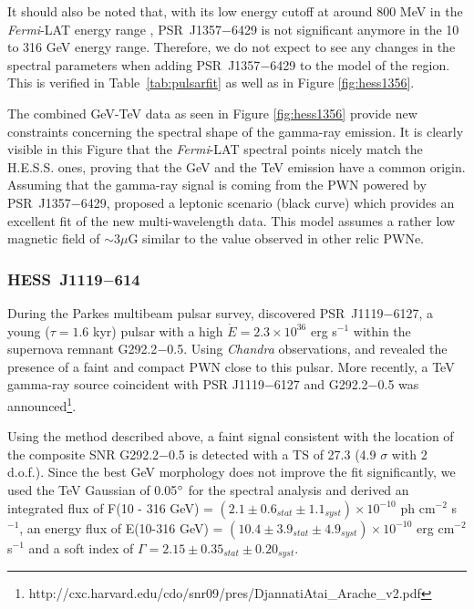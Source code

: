 It should also be noted that, with its low energy cutoff at around 800 MeV in the \emph{Fermi}-LAT energy range \citep{2011AA...533A.102L}, PSR~J1357$-$6429 is not significant anymore in the 10 to 316 GeV energy range. Therefore, we do not expect to see any changes in the spectral parameters when adding PSR~J1357$-$6429 to the model of the region. This is verified in Table~\ref{tab:pulsarfit} as well as in Figure \ref{fig:hess1356}. 

The combined GeV-TeV data as seen in Figure \ref{fig:hess1356} provide new constraints concerning the spectral shape of the gamma-ray emission. It is clearly visible in this Figure that the \emph{Fermi}-LAT spectral points nicely match the H.E.S.S. ones, proving that the GeV and the TeV emission have a common origin. Assuming that the gamma-ray signal is coming from the PWN powered by PSR~J1357$-$6429, \cite{2011AA...533A.103H} proposed a leptonic scenario (black curve) which provides an excellent fit of the new multi-wavelength data. This model assumes a rather low magnetic field of $\sim 3 \mu$G similar to the value observed in other relic PWNe. 

\subsubsection*{HESS~J1119$-$614}

During the Parkes multibeam pulsar survey, \cite{2000ApJ...541..367C} discovered PSR~J1119$-$6127, a young ($\tau = 1.6$ kyr) pulsar with a high $\dot{E} = 2.3 \times 10^{36}$ erg s$^{-1}$ within the supernova remnant G292.2$-$0.5. Using \emph{Chandra} observations, \cite{2003ApJ...591L.143G} and \cite{2008ApJ...684..532S} revealed the presence of a faint and compact PWN close to this pulsar. More recently, a TeV gamma-ray source coincident with PSR J1119$-$6127 and G292.2$-$0.5 was announced\footnote{http://cxc.harvard.edu/cdo/snr09/pres/DjannatiAtai\_Arache\_v2.pdf}.

Using the method described above, a faint signal consistent with the location of the composite SNR G292.2$-$0.5 is detected with a TS of 27.3 (4.9 $\sigma$ with 2 d.o.f.). Since the best GeV morphology does not improve the fit significantly, we used the TeV Gaussian of 0.05$\mbox{$^\circ$}$ for the spectral analysis and derived an integrated flux of F(10 - 316 GeV) = $(2.1 \pm 0.6_{stat} \pm 1.1_{syst}) \times 10^{-10}$ ph cm$^{-2}$ s$^{-1}$, an energy flux of E(10-316 GeV) = $(10.4 \pm 3.9_{stat} \pm 4.9_{syst}) \times 10^{-10}$ erg cm$^{-2}$ s$^{-1}$ and a soft index of $\Gamma = 2.15 \pm 0.35_{stat} \pm 0.20_{syst}$.

